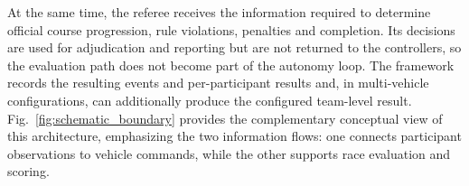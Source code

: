 

At the same time, the referee receives the information required to determine
official course progression, rule violations, penalties and completion. Its
decisions are used for adjudication and reporting but are not returned to the
controllers, so the evaluation path does not become part of the autonomy loop.
The framework records the resulting events and per-participant results and, in
multi-vehicle configurations, can additionally produce the configured team-level
result. Fig.~\ref{fig:schematic_boundary} provides the complementary conceptual
view of this architecture, emphasizing the two information flows: one connects
participant observations to vehicle commands, while the other supports race
evaluation and scoring.


